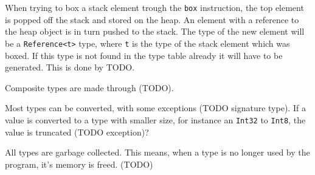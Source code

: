 When trying to box a stack element trough the {\tt box} instruction, the top
element is popped off the stack and stored on the heap. An element with a
reference to the heap object is in turn pushed to the stack. The type of the new
element will be a {\tt Reference<t>} type, where {\tt t} is the type of the
stack element which was boxed. If this type is not found in the type table
already it will have to be generated. This is done by TODO.

Composite types are made through (TODO).

Most types can be converted, with some exceptions (TODO signature type). If a
value is converted to a type with smaller size, for instance an {\tt Int32} to
{\tt Int8}, the value is truncated (TODO exception)?

All types are garbage collected. This means, when a type is no longer used by
the program, it's memory is freed. (TODO)
